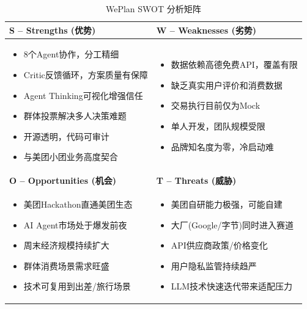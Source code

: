 \documentclass[12pt,a4paper]{ctexart}
\begin{document}
\begin{table}[H]
\centering
\caption{WePlan SWOT 分析矩阵}
\label{tab:swot}
\renewcommand{\arraystretch}{1.4}
\begin{tabularx}{\textwidth}{XX}
\toprule
\textbf{S -- Strengths (优势)} & \textbf{W -- Weaknesses (劣势)} \\
\midrule
\begin{itemize}[nosep,leftmargin=1em]
\item 8个Agent协作，分工精细
\item Critic反馈循环，方案质量有保障
\item Agent Thinking可视化增强信任
\item 群体投票解决多人决策难题
\item 开源透明，代码可审计
\item 与美团小团业务高度契合
\end{itemize}
&
\begin{itemize}[nosep,leftmargin=1em]
\item 数据依赖高德免费API，覆盖有限
\item 缺乏真实用户评价和消费数据
\item 交易执行目前仅为Mock
\item 单人开发，团队规模受限
\item 品牌知名度为零，冷启动难
\end{itemize}
\\
\midrule
\textbf{O -- Opportunities (机会)} & \textbf{T -- Threats (威胁)} \\
\midrule
\begin{itemize}[nosep,leftmargin=1em]
\item 美团Hackathon直通美团生态
\item AI Agent市场处于爆发前夜
\item 周末经济规模持续扩大
\item 群体消费场景需求旺盛
\item 技术可复用到出差/旅行场景
\end{itemize}
&
\begin{itemize}[nosep,leftmargin=1em]
\item 美团自研能力极强，可能自建
\item 大厂(Google/字节)同时进入赛道
\item API供应商政策/价格变化
\item 用户隐私监管持续趋严
\item LLM技术快速迭代带来适配压力
\end{itemize}
\\
\bottomrule
\end{tabularx}
\end{table}
\end{document}
